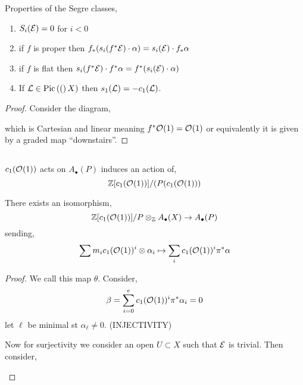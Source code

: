 \documentclass[12pt]{article}
\begin{document}
\begin{prop}
Properties of the Segre classes,
\begin{enumerate}
\item $S_i(\mathcal{E}) = 0$ for $i < 0$

\item if $f$ is proper then $f_* (s_i(f^* \mathcal{E}) \cdot \alpha) = s_i(\mathcal{E}) \cdot f_* \alpha$

\item if $f$ is flat then $s_i(f^* \mathcal{E}) \cdot f^* \alpha = f^* (s_i(\mathcal{E}) \cdot \alpha)$

\item If $\mathcal{L} \in \mathrm{Pic} \left( ( \right)X)$ then $s_1(\mathcal{L}) = - c_1(\mathcal{L})$.
\end{enumerate}
\end{prop}

\begin{proof}
Consider the diagram,
\begin{center}
\end{center}
which is Cartesian and linear meaning $f^* \mathcal{O}_{}(1) = \mathcal{O}_{}(1)$ or equivalently it is given by a graded map ``downstairs''. 
\end{proof}

\subsection{}

$c_1(\mathcal{O}_{}(1))$ acts on $A_\bullet(P)$ induces an action of,
\[ \mathbb{Z}[ c_1(\mathcal{O}_{}(1)) ] / (P(c_1(\mathcal{O}_{}(1))) \]

\begin{theorem}
There exists an isomorphism,
\[ \mathbb{Z}[c_1(\mathcal{O}_{}(1))] / P \otimes_{\mathbb{Z}} A_\bullet(X) \to A_\bullet(P) \]
sending,
\[ \sum m_i c_1(\mathcal{O}_{}(1))^i \otimes \alpha_i \mapsto \sum_i c_1(\mathcal{O}_{}(1))^i \pi^* \alpha \]
\end{theorem}

\begin{proof}
We call this map $\theta$. Consider,
\[ \beta = \sum_{i = 0}^e c_1(\mathcal{O}_{}(1))^i \pi^* \alpha_i = 0 \]
let $\ell$ be minimal st $\alpha_\ell \neq 0$. 
(INJECTIVITY)

Now for surjectivity we consider an open $U \subset X$ such that $\mathcal{E}$ is trivial. Then consider,
\begin{center}
\end{center}

\end{proof}
\end{document}
